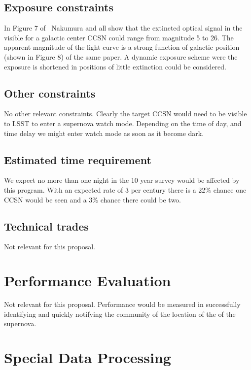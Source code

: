 \documentclass[12pt, letterpaper]{article}
\begin{document}
\subsection{Exposure constraints}

In Figure 7 of~\cite{2016MNRAS.461.3296N} Nakumura and all show that
the extincted optical signal in the visible for a galactic center CCSN
could range from magnitude 5 to 26. The apparent magnitude of the
light curve is a strong function of galactic position (shown in Figure
8) of the same paper.  A dynamic exposure scheme were the exposure is
shortened in positions of little extinction could be considered.

\subsection{Other constraints}

No other relevant constraints.  Clearly the target CCSN would need to be
visible to LSST to enter a supernova watch mode.  Depending on the
time of day, and time delay we might enter watch mode as soon as it
become dark.

\subsection{Estimated time requirement}

We expect no more than one night in the 10 year survey would be
affected by this program. With an expected rate of 3 per century there
is a 22\% chance one CCSN would be seen and a 3\% chance there could
be two.

\subsection{Technical trades}

Not relevant for this proposal.

\section{Performance Evaluation}

Not relevant for this proposal.  Performance would be measured in successfully
identifying and quickly notifying the community of the location of the
of the supernova.

\section{Special Data Processing}
\end{document}
